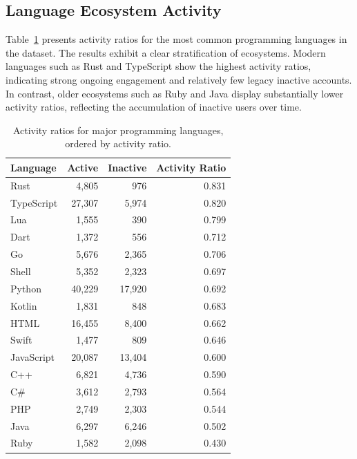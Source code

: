 \documentclass[12pt,a4paper]{article}
\begin{document}
\subsection{Language Ecosystem Activity}

Table~\ref{tab:language-activity} presents activity ratios for the most common programming languages in the dataset. The results exhibit a clear stratification of ecosystems. Modern languages such as Rust and TypeScript show the highest activity ratios, indicating strong ongoing engagement and relatively few legacy inactive accounts. In contrast, older ecosystems such as Ruby and Java display substantially lower activity ratios, reflecting the accumulation of inactive users over time.

\begin{table}[h]
\centering
\begin{tabular}{lrrr}
\toprule
Language & Active & Inactive & Activity Ratio \\
\midrule
Rust        & 4{,}805  &    976   & 0.831 \\
TypeScript  & 27{,}307 &  5{,}974 & 0.820 \\
Lua         & 1{,}555  &    390   & 0.799 \\
Dart        & 1{,}372  &    556   & 0.712 \\
Go          & 5{,}676  &  2{,}365 & 0.706 \\
Shell       & 5{,}352  &  2{,}323 & 0.697 \\
Python      & 40{,}229 & 17{,}920 & 0.692 \\
Kotlin      & 1{,}831  &    848   & 0.683 \\
HTML        & 16{,}455 &  8{,}400 & 0.662 \\
Swift       & 1{,}477  &    809   & 0.646 \\
JavaScript  & 20{,}087 & 13{,}404 & 0.600 \\
C++         & 6{,}821  &  4{,}736 & 0.590 \\
C\#         & 3{,}612  &  2{,}793 & 0.564 \\
PHP         & 2{,}749  &  2{,}303 & 0.544 \\
Java        & 6{,}297  &  6{,}246 & 0.502 \\
Ruby        & 1{,}582  &  2{,}098 & 0.430 \\
\bottomrule
\end{tabular}
\caption{Activity ratios for major programming languages, ordered by activity ratio.}
\label{tab:language-activity}
\end{table}
\end{document}
